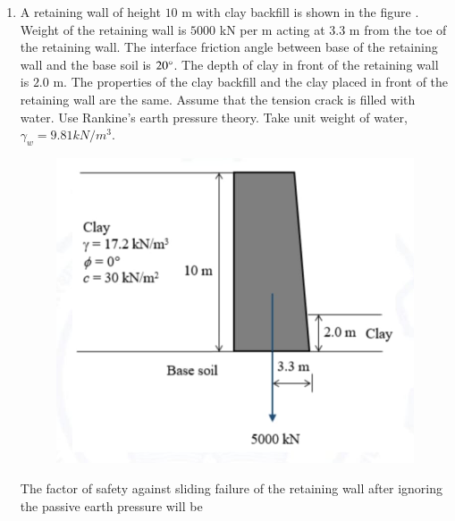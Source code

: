 \documentclass[journal,12pt,onecolumn]{article}
\theoremstyle{remark}
\begin{document}
\begin{enumerate}
\item A retaining wall of height $10$ m with clay backfill is shown in the figure . Weight of the retaining wall is $5000$ kN per m acting at $3.3$ m from the toe of the retaining wall. The interface friction angle between base of the retaining wall and the base soil is $20\degree$. The depth of clay in front of the retaining wall is $2.0$ m. The properties of the clay backfill and the clay placed in front of the retaining wall are the same. Assume that the tension crack is filled with water. Use Rankine's earth pressure theory. Take unit weight of water, $\gamma_w = 9.81 kN/m^3$.
\begin{figure}[H]
    \centering
    \includegraphics[width=0.7\columnwidth]{figs/1q45.jpg}
    \caption{}
    \label{fig:q45}
\end{figure}
The factor of safety  against sliding failure of the retaining wall after ignoring the passive earth pressure will be \underline{\hspace{2cm}}

\hfill{}


\end{enumerate}
\end{document}
